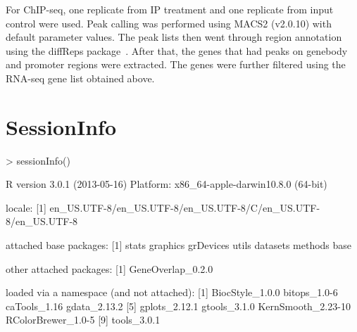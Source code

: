 \documentclass{article}
\begin{document}
For ChIP-seq, one replicate from IP treatment and one replicate from input control were used. Peak calling was performed using MACS2 (v2.0.10) with default parameter values. The peak lists then went through region annotation using the diffReps package~\cite{diffReps}. After that, the genes that had peaks on genebody and promoter regions were extracted. The genes were further filtered using the RNA-seq gene list obtained above.

\section{SessionInfo}
\begin{Schunk}
\begin{Sinput}
> sessionInfo()
\end{Sinput}
\begin{Soutput}
R version 3.0.1 (2013-05-16)
Platform: x86_64-apple-darwin10.8.0 (64-bit)

locale:
[1] en_US.UTF-8/en_US.UTF-8/en_US.UTF-8/C/en_US.UTF-8/en_US.UTF-8

attached base packages:
[1] stats     graphics  grDevices utils     datasets  methods   base     

other attached packages:
[1] GeneOverlap_0.2.0

loaded via a namespace (and not attached):
[1] BiocStyle_1.0.0    bitops_1.0-6       caTools_1.16       gdata_2.13.2      
[5] gplots_2.12.1      gtools_3.1.0       KernSmooth_2.23-10 RColorBrewer_1.0-5
[9] tools_3.0.1       
\end{Soutput}
\end{Schunk}



\end{document}
